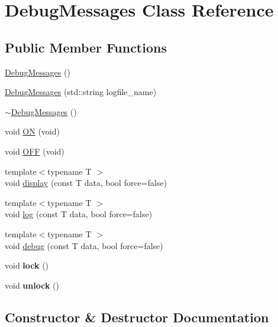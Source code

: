 \hypertarget{classDebugMessages}{}\section{Debug\+Messages Class Reference}
\label{classDebugMessages}
\subsection*{Public Member Functions}
\begin{DoxyCompactItemize}
\item 
\hyperlink{classDebugMessages_a7fb2c5a7cce97eb05661b1f6657cb650}{Debug\+Messages} ()
\item 
\hyperlink{classDebugMessages_aa60430ca0e05e43a8bb27f4cdc1a158c}{Debug\+Messages} (std\+::string logfile\+\_\+name)
\item 
\hyperlink{classDebugMessages_a3700e476ad70d27ba14be67b43ff6f69}{$\sim$\+Debug\+Messages} ()
\item 
void \hyperlink{classDebugMessages_a95866775dcf301773daa7bed529c557e}{ON} (void)
\item 
void \hyperlink{classDebugMessages_ac1e4085ade0d1ff7b603fd8205f74b7c}{O\+FF} (void)
\item 
{\footnotesize template$<$typename T $>$ }\\void \hyperlink{classDebugMessages_a09343725fb16b9e9d3c5587880e8401e}{display} (const T data, bool force=false)
\item 
{\footnotesize template$<$typename T $>$ }\\void \hyperlink{classDebugMessages_a6b7e8eb509b3d0903e918ae25dec18aa}{log} (const T data, bool force=false)
\item 
{\footnotesize template$<$typename T $>$ }\\void \hyperlink{classDebugMessages_aac71fdadaf41ce9a3dd7dd502096fb51}{debug} (const T data, bool force=false)
\item 
void {\bfseries lock} ()\hypertarget{classDebugMessages_abb8c29cf2e650f04b45edf0087b47d81}{}\label{classDebugMessages_abb8c29cf2e650f04b45edf0087b47d81}

\item 
void {\bfseries unlock} ()\hypertarget{classDebugMessages_a575b874fbfdadaf91eaa7ec4599c78e3}{}\label{classDebugMessages_a575b874fbfdadaf91eaa7ec4599c78e3}

\end{DoxyCompactItemize}


\subsection{Constructor \& Destructor Documentation}
